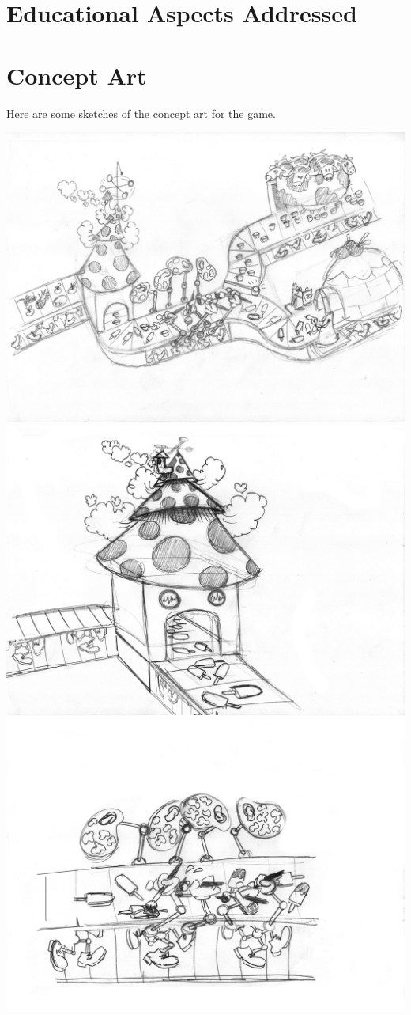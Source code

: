 \documentclass{sigchi}
\begin{document}
\section{Educational Aspects Addressed}

\section{Concept Art}

	Here are some sketches of the concept art for the game.
	\begin{center}
		\includegraphics[width=0.9\columnwidth]{01}
		\includegraphics[width=0.9\columnwidth]{02}
		\includegraphics[width=0.9\columnwidth]{03}

\end{center}
\end{document}
